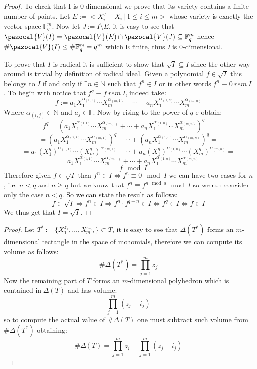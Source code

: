 \documentclass[11pt,a4paper]{report}
\theoremstyle{plain}
\theoremstyle{definition}
\newcommand{\V}{\pazocal{V}}
\begin{document}
\begin{thm-hand}[3.1.4]
\end{thm-hand}
\begin{proof}
	To check that I is 0-dimensional we prove that its variety contains a finite number of points. Let $E := <X_i^q - X_i\ |\ 1 \le i \le m>$ whose variety is exactly the vector space $\mathbb{F}_q^m$. Now let $J := I \setminus E$, it is easy to see that $\V(I) = \V(E) \cap \V(J) \subseteq \mathbb{F}_q^m$ hence $\#\V(I) \le \#\mathbb{F}_q^m = q^m$ which is finite, thus $I$ is 0-dimensional.
	
	To prove that $I$ is radical it is sufficient to show that $\sqrt{I} \subseteq I$ since the other way around is trivial by definition of radical ideal. Given a polynomial $f \in \sqrt{I}$ this belongs to $I$ if and only if $\exists n\in \mathbb{N}$ such that $f^n \in I$ or in other words $f^n \equiv 0\ rem\ I$.
	To begin with notice that $f^q \equiv f\ rem\ I$, indeed take:
	\[
		f := a_1X_1^{\alpha_{(1,1)}}\cdots X_m^{\alpha_{(m,1)}} + \cdots + a_n X_1^{\alpha_{(1,n)}}\cdots X_m^{\alpha_{(m,n)}}			
	\]
	Where $\alpha_{(i,j)} \in \mathbb{N}$ and $a_j \in \mathbb{F}$. Now by rising to the power of $q$ e obtain:
		\[
			f^q = (a_1X_1^{\alpha_{(1,1)}}\cdots X_m^{\alpha_{(m,1)}} + \cdots + a_n X_1^{\alpha_{(1,n)}}\cdots X_m^{\alpha_{(m,n)}})^q =
		\]
		\[
			= 	(a_1X_1^{\alpha_{(1,1)}}\cdots X_m^{\alpha_{(m,1)}})^q + \cdots + (a_n X_1^{\alpha_{(1,n)}}\cdots X_m^{\alpha_{(m,n)}})^q = 
		\]
		\[
			= a_1(X_1^q)^{\alpha_{(1,1)}}\cdots (X_m^q)^{\alpha_{(m,1)}} + \cdots + a_n (X_1^q)^{\alpha_{(1,n)}}\cdots (X_m^q)^{\alpha_{(m,n)}} =
		\]
		\[
			= 	a_1X_1^{\alpha_{(1,1)}}\cdots X_m^{\alpha_{(m,1)}} + \cdots + a_n X_1^{\alpha_{(1,n)}}\cdots X_m^{\alpha_{(m,n)}}	
		\]
		\[
		 = f \mod I		
		\]
		Therefore given $f \in \sqrt{I}$ then $f^n \in I \iff f^n \equiv 0 \mod I$ we can have two cases for $n$, i.e. $n < q$ and $n \ge q$ but we know that $f^n \equiv f^{n \mod q} \mod I$ so we can consider only the case $n < q$. 
		So we can state the result as follows:
		\[
			f \in \sqrt{I}	 \Rightarrow f^n \in I \Rightarrow f^n \cdot f^{q-n} \in I \iff f^q \in I \iff f \in I
		\]
		We thus get that $I = \sqrt{I}$.
\end{proof}

\begin{lem-hand}[3.1.9]
\end{lem-hand}
\begin{proof}
	Let $T^* := \{X_1^{z_1}, \ldots, X_m^{z_m},\} \subset T$, it is easy to see that $\Delta(T^*)$ forms an $m$-dimensional rectangle in the space of monomials, therefore we can compute its volume as follows:
	\[
		\#\Delta(T^*) = \prod\limits_{j = 1}^m z_j
	\]
	Now the remaining part of $T$ forms an $m$-dimensional polyhedron which is contained in $\Delta(T)$ and has volume:
	\[
		\prod\limits_{j = 1}^m (z_j - i_j)
	\]	
	 so to compute the actual value of $\#\Delta(T)$ one must subtract such volume from $\#\Delta(T^*)$ obtaining:
	 \[
		\#\Delta(T) = 	\prod\limits_{j = 1}^m z_j - \prod\limits_{j = 1}^m (z_j - i_j)
	 \]
\end{proof}
\end{document}
